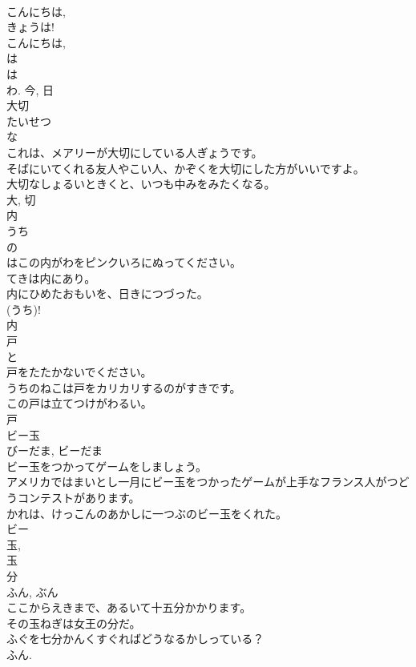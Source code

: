 \documentclass[8pt]{extreport}
\begin{document}
\begin{CJK}{UTF8}{min}
\\	こんにちは, 
\\	きょうは! 
\\	こんにちは, 
\\	は 
\\	は 
\\	わ.	今, 日	
\\	大切	
\\	たいせつ	
\\	な 
\\	これは、メアリーが大切にしている人ぎょうです。	
\\	そばにいてくれる友人やこい人、かぞくを大切にした方がいいですよ。	
\\	大切なしょるいときくと、いつも中みをみたくなる。	
\\	大, 切	
\\	内	
\\	うち	
\\	の 
\\	はこの内がわをピンクいろにぬってください。	
\\	てきは内にあり。	
\\	内にひめたおもいを、日きにつづった。	
\\	(うち)! 
\\	内	
\\	戸	
\\	と	
\\	戸をたたかないでください。	
\\	うちのねこは戸をカリカリするのがすきです。	
\\	この戸は立てつけがわるい。	
\\	戸	
\\	ビー玉	
\\	びーだま, ビーだま	
\\	ビー玉をつかってゲームをしましょう。	
\\	アメリカではまいとし一月にビー玉をつかったゲームが上手なフランス人がつどうコンテストがあります。	
\\	かれは、けっこんのあかしに一つぶのビー玉をくれた。	
\\	ビー 
\\	玉, 
\\	玉	
\\	分	
\\	ふん, ぶん	
\\	ここからえきまで、あるいて十五分かかります。	
\\	その玉ねぎは女王の分だ。	
\\	ふぐを七分かんくすぐればどうなるかしっている？	
\\	ふん. 

\end{CJK}
\end{document}
